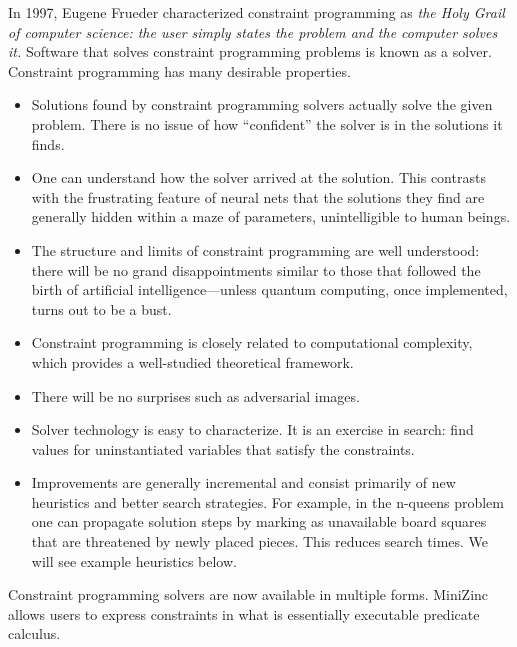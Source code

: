 In 1997, Eugene Frueder characterized constraint programming as \textit{the Holy Grail of computer science: the user simply states the problem and the computer solves it.}\cite{freuder1997pursuit}  Software that solves constraint programming problems is known as a solver. Constraint programming has many desirable properties. 
\begin{itemize}
    \item Solutions found by constraint programming solvers actually solve the given problem. There is no issue of how ``confident'' the solver is in the solutions it finds.
    
    \item One can understand how the solver arrived at the solution. This contrasts with the frustrating feature of neural nets that the solutions they find are generally hidden within a maze of parameters, unintelligible to human beings. 

    \item  The structure and limits of constraint programming are well understood: there will be no grand disappointments similar to those that followed the birth of artificial intelligence---unless quantum computing, once implemented, turns out to be a bust. 
    
    \item Constraint programming is closely related to computational complexity, which provides a well-studied theoretical framework. 
    
    \item There will be no surprises such as adversarial images. 

    \item Solver technology is easy to characterize. It is an exercise in search: find values for uninstantiated variables that satisfy the constraints.

    \item Improvements are generally incremental and consist primarily of new heuristics and better search strategies. For example, in the n-queens problem one can propagate solution steps by marking as unavailable board squares that are threatened by newly placed pieces. This reduces search times. We will see  example heuristics below.

\end{itemize}

Constraint programming solvers are now available in multiple forms. MiniZinc\cite{wallace2020problem} allows users to express constraints in what is essentially executable predicate calculus.

